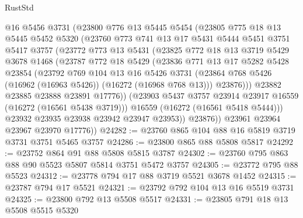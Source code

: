 \begin{lexlean}{RustStd}
\begin{coremodule}
            @16
            @5456
            @3731
            (@23800
              @776
              @13
              @5445
              @5454
              (@23805
                @775
                @18
                @13
                @5445
                @5452
                @5320
                (@23760
                  @773
                  @741
                  @13
                  @17
                  @5431
                  @5444
                  @5451
                  @3751
                  @5417
                  @3757
                  (@23772
                    @773
                    @13
                    @5431
                    (@23825
                      @772
                      @18
                      @13
                      @3719
                      @5429
                      @3678
                      @1468
                      (@23787
                        @772
                        @18
                        @5429
                        (@23836
                          @771
                          @13
                          @17
                          @5282
                          @5428
                          @23854
                          (@23792
                            @769
                            @104
                            @13
                            @16
                            @5426
                            @3731
                            (@23864 @768 @5426 (@16962 (@16963 @5426)) (@16272 (@16968 @768 @13)))
                            @23876)))
                      @23882
                      @23885
                      @23888
                      @23891
                      @17776))
                  (@23903 @5437 @3757 @23914 @23917 @16559 (@16272 (@16561 @5438 @3719)))
                  @16559
                  (@16272 (@16561 @5418 @5444)))
                @23932
                @23935
                @23938
                @23942
                @23947
                @23953))
            @23876))
        @23961
        @23964
        @23967
        @23970
        @17776))
@24282 := @23760 @865 @104 @88 @16 @5819 @3719 @3731 @3751 @5465 @3757
@24286 := @23800 @865 @88 @5808 @5817
@24292 := @23752 @864 @91 @88 @5808 @5815 @3787
@24302 := @23760 @795 @863 @88 @90 @5523 @5807 @5814 @3751 @5472 @3757
@24305 := @23772 @795 @88 @5523
@24312 := @23778 @794 @17 @88 @3719 @5521 @3678 @1452
@24315 := @23787 @794 @17 @5521
@24321 := @23792 @792 @104 @13 @16 @5519 @3731
@24325 := @23800 @792 @13 @5508 @5517
@24331 := @23805 @791 @18 @13 @5508 @5515 @5320

\end{coremodule}
\end{lexlean}
